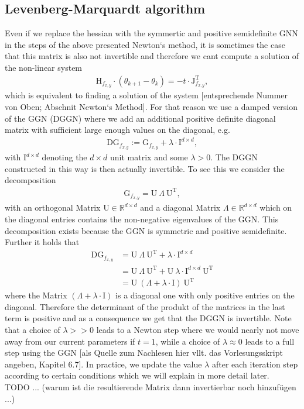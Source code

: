 \documentclass[conference]{IEEEtran}
\begin{document}
\subsection{Levenberg-Marquardt algorithm }
Even if we replace the hessian with the symmertic and positive semidefinite GNN in the steps of the above presented Newton`s method, it is sometimes the case that this matrix is also not invertible and therefore we cant compute a solution of the non-linear system 
\begin{align}
\mathrm{H}_{f_{x, y}}\cdot(\theta_{k+1} - \theta_{k}) = -t\cdot\mathrm{J}_{f_{x, y}}^{\mathrm{T}},
\end{align}
which is equivalent to finding a solution of the system [entsprechende Nummer von Oben; Abschnit Newton`s Method].
For that reason we use a damped version of the GGN (DGGN) where we add an additional positive definite diagonal matrix with sufficient large enough values on the diagonal, e.g.
\begin{align}
\mathrm{DG}_{f_{x, y}} := \mathrm{G}_{f_{x, y}} + \lambda\cdot\mathrm{I}^{d\times d},
\end{align}
with $\mathrm{I}^{d\times d}$ denoting the $d\times d$ unit matrix and some $\lambda>0$.
The DGGN constructed in this way is then actually invertible. 
To see this we consider the decomposition
\begin{align}
\mathrm{G}_{f_{x, y}} = \mathrm{U}\:\Lambda\:\mathrm{U}^{\mathrm{T}},
\end{align}
with an orthogonal Matrix $\mathrm{U}\in\mathbb{R}^{d\times d}$ and a diagonal Matrix $\Lambda\in\mathbb{R}^{d\times d}$ which on the diagonal entries contains the non-negative eigenvalues of the GGN. This decomposition exists because the GGN is symmetric and positive semidefinite. Further it holds that
\begin{align}
\mathrm{DG}_{f_{x, y}} &= \mathrm{U}\:\Lambda\:\mathrm{U}^{\mathrm{T}} + \lambda\cdot\mathrm{I}^{d\times d}\\
&= \mathrm{U}\:\Lambda\:\mathrm{U}^{\mathrm{T}} + \mathrm{U}\:\lambda\cdot\mathrm{I}^{d\times d}\:\mathrm{U}^{\mathrm{T}}\\
&= \mathrm{U}\:\left(\Lambda + \lambda\cdot\mathrm{I}\right)\:\mathrm{U}^{\mathrm{T}}
\end{align}
where the Matrix $\left(\Lambda + \lambda\cdot\mathrm{I}\right)$ is a diagonal one with only positive entries on the diagonal. Therefore the determinant of the produkt of the matrices in the last term is positive and as a consequence we get that the DGGN is invertible.
Note that a choice of $\lambda>>0$ leads to a Newton step where we would nearly not move away from our current parameters if $t = 1$, while a choice of $\lambda\approx 0$ leads to a full step using the GGN [als Quelle zum Nachlesen hier vllt. das Vorlesungsskript angeben, Kapitel 6.7]. In practice, we update the value $\lambda$ after each iteration step according to certain conditions which we will explain in more detail later.
\\TODO ... (warum ist die resultierende Matrix dann invertierbar noch hinzufügen ...)
\end{document}
